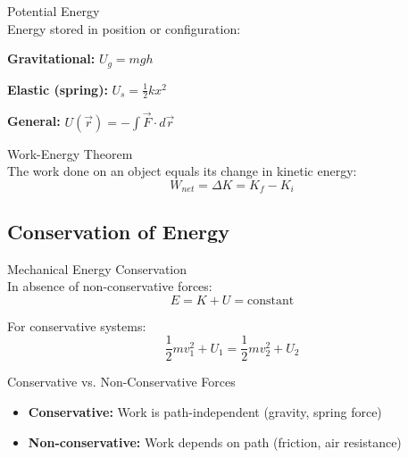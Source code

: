 \begin{definition}{Potential Energy}\\
    Energy stored in position or configuration:
    
    \textbf{Gravitational:} $U_g = mgh$
    
    \textbf{Elastic (spring):} $U_s = \frac{1}{2}kx^2$
    
    \textbf{General:} $U(\vec{r}) = -\int \vec{F} \cdot d\vec{r}$
\end{definition}

\begin{concept}{Work-Energy Theorem}\\
    The work done on an object equals its change in kinetic energy:
    $$W_{net} = \Delta K = K_f - K_i$$
\end{concept}

\subsection{Conservation of Energy}

\begin{concept}{Mechanical Energy Conservation}\\
    In absence of non-conservative forces:
    $$E = K + U = \text{constant}$$
    
    For conservative systems:
    $$\frac{1}{2}mv_1^2 + U_1 = \frac{1}{2}mv_2^2 + U_2$$
\end{concept}

\begin{definition}{Conservative vs. Non-Conservative Forces}
    \begin{itemize}
        \item \textbf{Conservative:} Work is path-independent (gravity, spring force)
        \item \textbf{Non-conservative:} Work depends on path (friction, air resistance)
    \end{itemize}
\end{definition}


